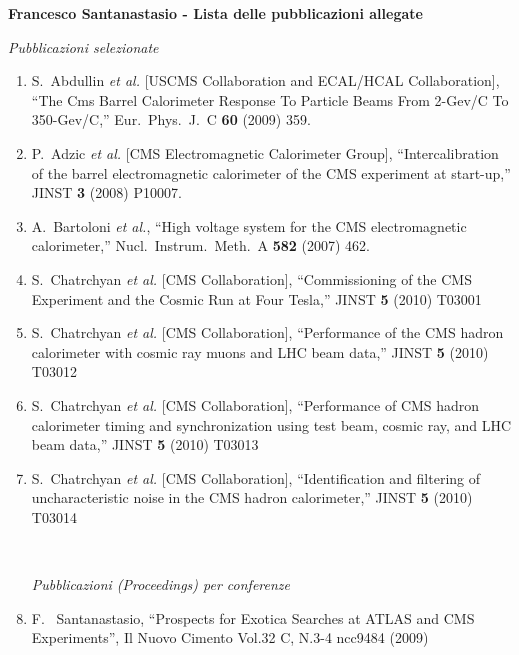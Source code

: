 \documentclass[10pt]{letter}
\begin{document}
{\large \sc \bf Francesco Santanastasio - Lista delle pubblicazioni allegate}

\begin{center} \textit{Pubblicazioni selezionate} \end{center}

\begin{enumerate}
\item S.~Abdullin {\it et al.}  [USCMS Collaboration and ECAL/HCAL Collaboration],
  ``The Cms Barrel Calorimeter Response To Particle Beams From 2-Gev/C To 350-Gev/C,''
  Eur.\ Phys.\ J.\  C {\bf 60} (2009) 359.
\item P.~Adzic {\it et al.}  [CMS Electromagnetic Calorimeter Group],
  ``Intercalibration of the barrel electromagnetic calorimeter of the CMS
  experiment at start-up,'' JINST {\bf 3} (2008) P10007.
\item A.~Bartoloni {\it et al.},
  ``High voltage system for the CMS electromagnetic calorimeter,''
  Nucl.\ Instrum.\ Meth.\  A {\bf 582} (2007) 462.
\item S.~Chatrchyan {\it et al.}  [CMS Collaboration],
  ``Commissioning of the CMS Experiment and the Cosmic Run at Four Tesla,''
  JINST {\bf 5} (2010) T03001
\item S.~Chatrchyan {\it et al.}  [CMS Collaboration],
  ``Performance of the CMS hadron calorimeter with cosmic ray muons and LHC beam data,''
  JINST {\bf 5} (2010) T03012
\item S.~Chatrchyan {\it et al.}  [CMS Collaboration],
  ``Performance of CMS hadron calorimeter timing and synchronization using test beam, cosmic ray, and LHC beam data,''
  JINST {\bf 5} (2010) T03013
\item S.~Chatrchyan {\it et al.}  [CMS Collaboration],
  ``Identification and filtering of uncharacteristic noise in the CMS hadron calorimeter,''
  JINST {\bf 5} (2010) T03014

~\\
\begin{center} \textit{Pubblicazioni (Proceedings) per conferenze} \\ 
\end{center}

\item F. ~Santanastasio, ``Prospects for Exotica Searches at ATLAS and CMS Experiments'', 
  Il Nuovo Cimento Vol.32 C, N.3-4 ncc9484 (2009)


\end{enumerate}
\end{document}
